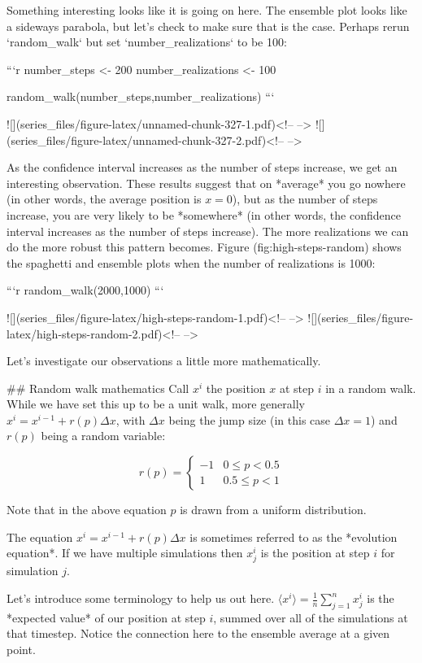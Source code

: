 \documentclass[
]{book}
\theoremstyle{definition}
\theoremstyle{definition}
\theoremstyle{definition}
\theoremstyle{remark}
\begin{document}
Something interesting looks like it is going on here.  The ensemble plot looks like a sideways parabola, but let's check to make sure that is the case.  Perhaps rerun `random_walk` but set `number_realizations` to be 100:


```r
number_steps <- 200
number_realizations <- 100

random_walk(number_steps,number_realizations)
```

![](series_files/figure-latex/unnamed-chunk-327-1.pdf)<!-- --> ![](series_files/figure-latex/unnamed-chunk-327-2.pdf)<!-- --> 

As the confidence interval increases as the number of steps increase, we get an interesting observation. These results suggest that on *average* you go nowhere (in other words, the average position is $x=0$), but as the number of steps increase, you are very likely to be *somewhere* (in other words, the confidence interval increases as the number of steps increase).  The more realizations we can do the more robust this pattern becomes.  Figure  \@(fig:high-steps-random) shows the spaghetti and ensemble plots when the number of realizations is 1000:


```r
random_walk(2000,1000)
```

![](series_files/figure-latex/high-steps-random-1.pdf)<!-- --> ![](series_files/figure-latex/high-steps-random-2.pdf)<!-- --> 


Let's investigate our observations a little more mathematically.

## Random walk mathematics
Call $x^{i}$ the position $x$ at step $i$ in a random walk. While we have set this up to be a unit walk, more generally $x^{i}=x^{i-1}+r(p) \Delta x$, with $\Delta x$ being the jump size (in this case $\Delta x=1$) and $r(p)$ being a random variable:

\begin{equation}\label{eq:equal-prob}
r(p)=\begin{cases} -1 & 0 \leq p < 0.5 \\
1 & 0.5 \leq p < 1 \end{cases}
\end{equation}

Note that in the above equation $p$ is drawn from a uniform distribution.

The equation $x^{i}=x^{i-1}+r(p) \Delta x$ is sometimes referred to as the *evolution equation*. If we have multiple simulations then $x_{j}^{i}$ is the position at step $i$ for simulation $j$. 

Let's introduce some terminology to help us out here.  $\displaystyle \big \langle x^{i} \big \rangle = \frac{1}{n} \sum_{j=1}^{n} x_{j}^{i}$ is the *expected value* of our position at step $i$, summed over all of the simulations at that timestep.  Notice the connection here to the ensemble average at a given point.
\end{document}
